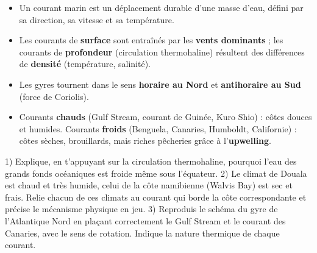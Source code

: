 \documentclass[11pt]{article}
\begin{document}
\begin{aretenir}
\begin{itemize}
\item Un courant marin est un déplacement durable d'une masse d'eau, défini par sa direction, sa vitesse et sa température.
\item Les courants de \textbf{surface} sont entraînés par les \textbf{vents dominants} ; les courants de \textbf{profondeur} (circulation thermohaline) résultent des différences de \textbf{densité} (température, salinité).
\item Les gyres tournent dans le sens \textbf{horaire au Nord} et \textbf{antihoraire au Sud} (force de Coriolis).
\item Courants \textbf{chauds} (Gulf Stream, courant de Guinée, Kuro Shio) : côtes douces et humides. Courants \textbf{froids} (Benguela, Canaries, Humboldt, Californie) : côtes sèches, brouillards, mais riches pêcheries grâce à l'\textbf{upwelling}.
\end{itemize}
\end{aretenir}

\begin{exercice}
1) Explique, en t'appuyant sur la circulation thermohaline, pourquoi l'eau des grands fonds océaniques est froide même sous l'équateur.
2) Le climat de Douala est chaud et très humide, celui de la côte namibienne (Walvis Bay) est sec et frais. Relie chacun de ces climats au courant qui borde la côte correspondante et précise le mécanisme physique en jeu.
3) Reproduis le schéma du gyre de l'Atlantique Nord en plaçant correctement le Gulf Stream et le courant des Canaries, avec le sens de rotation. Indique la nature thermique de chaque courant.
\end{exercice}
\end{document}

